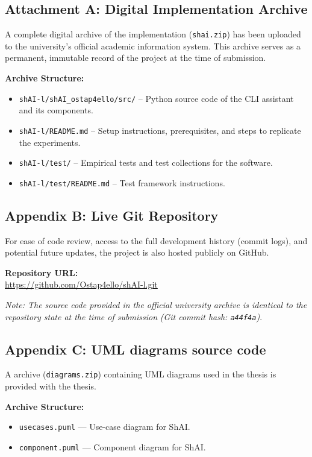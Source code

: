 \subsection*{Attachment A: Digital Implementation Archive}

A complete digital archive of the implementation (\texttt{shai.zip}) has been
uploaded to the university's official academic information system. This archive
serves as a permanent, immutable record of the project at the time of
submission.

\noindent \textbf{Archive Structure:}
\begin{itemize}
    \item \texttt{shAI-l/shAI\_ostap4ello/src/} -- Python source code of the CLI assistant and its components.
    \item \texttt{shAI-l/README.md} -- Setup instructions, prerequisites, and steps to replicate the experiments.
    \item \texttt{shAI-l/test/} -- Empirical tests and test collections for the software.
    \item \texttt{shAI-l/test/README.md} -- Test framework instructions.
\end{itemize}

\vspace{0.8cm}
\subsection*{Appendix B: Live Git Repository}

For ease of code review, access to the full development history (commit logs),
and potential future updates, the project is also hosted publicly on GitHub.

\vspace{0.3cm}
\noindent \textbf{Repository URL:} \\
\url{https://github.com/Ostap4ello/shAI-l.git}

\vspace{0.3cm}
\noindent \textit{Note: The source code provided in the official university
archive is identical to the repository state at the time of submission}
\textit{(Git commit hash: \texttt{a44f4a})}.

\vspace{0.8cm}
\subsection*{Appendix C: UML diagrams source code}

A archive (\texttt{diagrams.zip}) containing UML diagrams used in the thesis is
provided with the thesis.

\noindent \textbf{Archive Structure:}
\begin{itemize}
    \item \texttt{usecases.puml} --- Use-case diagram for ShAI.
    \item \texttt{component.puml} --- Component diagram for ShAI.
\end{itemize}
